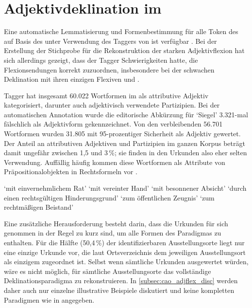 \section[Adjektivdeklination im \tit{Corpus der altdeutschen Originalurkunden}]{Adjektivdeklination im \CAO{}}
\label{sec:adjdeclcao}

\label{phsec:formelhaftigkeit}
Eine automatische Lemmatisierung und Formenbestimmung für alle Token des
\CAO{} auf Basis des \REM{} unter Verwendung des Taggers von
\citet{schmid2019} ist verfügbar
\autocites[vgl.][207]{beckerschallert2021}[155--158]{beckerschallert2022b}. Bei
der Erstellung der Stichprobe für die Rekonstruktion der starken
Adjektivflexion hat sich allerdings gezeigt, dass der Tagger Schwierigkeiten
hatte, die Flexionsendungen korrekt zuzuordnen, insbesondere bei der schwachen
Deklination mit ihren einzigen Flexiven  und .

 Tagger hat insgesamt 60.022 Wortformen im \CAO{}
als attributive Adjektiv kategorisiert, darunter auch adjektivisch verwendete
Partizipien. Bei der automatischen Annotation wurde die editorische Abkürzung
 für `Siegel' 3.321-mal fälschlich als Adjektivform gekennzeichnet.
Von den verbleibenden 56.701 Wortformen wurden 31.805 mit 95-prozentiger
Sicherheit als Adjektiv gewertet. Der Anteil an attributiven Adjektiven und
Partizipien im ganzen Korpus beträgt damit ungefähr zwischen 1,5 und 3\,\%;
sie finden in den Urkunden also eher selten Verwendung. Auffällig häufig kommen
diese Wortformen als Attribute von Präpositionalobjekten in Rechtsformeln vor
\autocites[\ref{ex:adjprepobj}; vgl.][30]{becker2016}.

\begin{exe}
\ex \label{ex:adjprepobj}
	\begin{xlist}
	\ex {}
		`mit einvernehmlichem Rat'
	\ex {}
		`mit vereinter Hand'
	\ex {}
		`mit besonnener Absicht'
	\ex {}
		`durch einen rechtsgültigen Hinderungsgrund'
	\ex {}
		`zum öffentlichen Zeugnis'
	\ex {}
		`zum rechtmäßigen Beistand'
	\end{xlist}
\end{exe}

Eine zusätzliche Herausforderung besteht darin, dass die Urkunden für sich
genommen in der Regel zu kurz sind, um alle Formen des Paradigmas zu enthalten.
Für die Hälfte (50,4\,\%) der identifizierbaren Ausstellungs\-orte liegt nur
eine einzige Urkunde vor, die laut Ortsverzeichnis dem jeweiligen
Ausstellungs\-ort als einzigem zugeordnet ist. Selbst wenn sämtliche Urkunden
ausgewertet würden, wäre es nicht möglich, für sämtliche Ausstellungs\-orte das
vollständige Deklinationsparadigma zu rekonstruieren. In
\cref{subsec:cao_adjflex_disc} werden daher auch nur einzelne illustrative
Beispiele diskutiert und keine kompletten Paradigmen wie in
 angegeben.

